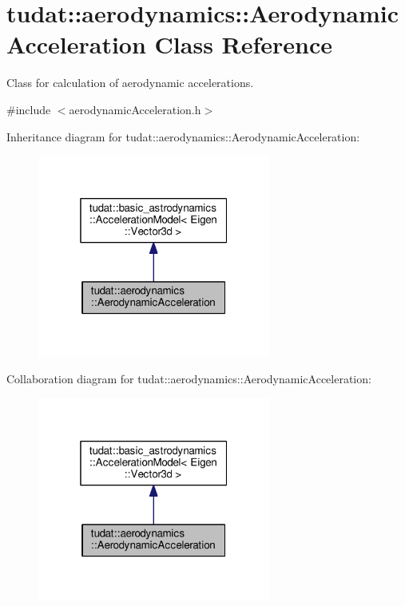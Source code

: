 \hypertarget{classtudat_1_1aerodynamics_1_1AerodynamicAcceleration}{}\section{tudat\+:\+:aerodynamics\+:\+:Aerodynamic\+Acceleration Class Reference}
\label{classtudat_1_1aerodynamics_1_1AerodynamicAcceleration}


Class for calculation of aerodynamic accelerations.  




{\ttfamily \#include $<$aerodynamic\+Acceleration.\+h$>$}



Inheritance diagram for tudat\+:\+:aerodynamics\+:\+:Aerodynamic\+Acceleration\+:
\nopagebreak
\begin{figure}[H]
\begin{center}
\leavevmode
\includegraphics[width=217pt]{classtudat_1_1aerodynamics_1_1AerodynamicAcceleration__inherit__graph}
\end{center}
\end{figure}


Collaboration diagram for tudat\+:\+:aerodynamics\+:\+:Aerodynamic\+Acceleration\+:
\nopagebreak
\begin{figure}[H]
\begin{center}
\leavevmode
\includegraphics[width=217pt]{classtudat_1_1aerodynamics_1_1AerodynamicAcceleration__coll__graph}
\end{center}
\end{figure}

